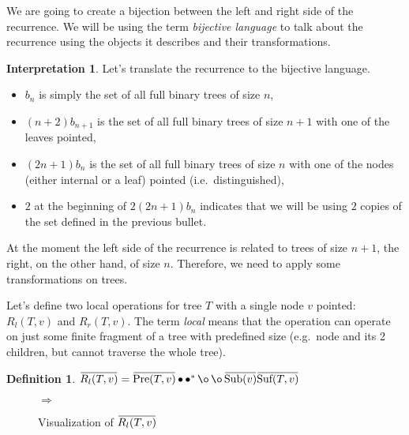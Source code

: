 \documentclass[final]{article}
\theoremstyle{definition}
\newtheorem{definition}{Definition}[subsection]
\theoremstyle{definition}
\newtheorem{interpretation}{Interpretation}[subsection]
\theoremstyle{remark}
\newcommand{\ols}[1]{\mskip.5\thinmuskip\overline{\mskip-.5\thinmuskip {#1} \mskip-.5\thinmuskip}\mskip.5\thinmuskip} %
\newcommand{\enc}[1]{\ensuremath{\ols{#1}}}
\newcommand{\pointed}[1]{\ensuremath{{#1}^*}}
\DeclareMathOperator{\tSub}{\text{Sub}}
\DeclareMathOperator{\tPre}{\text{Pre}}
\DeclareMathOperator{\tSuf}{\text{Suf}}
\DeclareMathOperator{\n}{\bullet}
\DeclareMathOperator{\no}{\o}
\begin{document}
We are going to create a bijection between the left and right side of the recurrence. We will be using the term \textit{bijective language} to talk about the recurrence using the objects it describes and their transformations.

\begin{interpretation}
Let's translate the recurrence to the bijective language.
\begin{itemize}
    \item \(b_n\) is simply the set of all full binary trees of size \(n\),
    \item \((n + 2) b_{n + 1}\) is the set of all full binary trees of size \(n + 1\) with one of the leaves pointed,
    \item \((2n + 1) b_{n}\) is the set of all full binary trees of size \(n\) with one of the nodes (either internal or a leaf) pointed (i.e.\ distinguished),
    \item \(2\) at the beginning of \(2 (2n + 1) b_{n}\) indicates that we will be using \(2\) copies of the set defined in the previous bullet.
\end{itemize}

At the moment the left side of the recurrence is related to trees of size \(n + 1\), the right, on the other hand, of size \(n\). Therefore, we need to apply some transformations on trees.

Let's define two local operations for tree \(T\) with a single node \(v\) pointed: \(R_l(T, v)\) and \(R_r(T, v)\). The term \textit{local} means that the operation can operate on just some finite fragment of a tree with predefined size (e.g.\ node and its 2 children, but cannot traverse the whole tree).

\begin{definition}
    \(\enc{R_l(T, v)} = \enc{\tPre(T, v)} \n \pointed{\n} \no \no \enc{\tSub(v)} \enc{\tSuf(T, v)}\)
\end{definition}

\begin{figure}[H]
    \centering
    \begin{minipage}{.25\textwidth}\end{minipage}%
    \(\Rightarrow\)
    \begin{minipage}{.4\textwidth}\end{minipage}%
    \caption{Visualization of \(\enc{R_l(T, v)}\)}
    \label{fig:remy_left}
\end{figure}


\end{interpretation}
\end{document}
